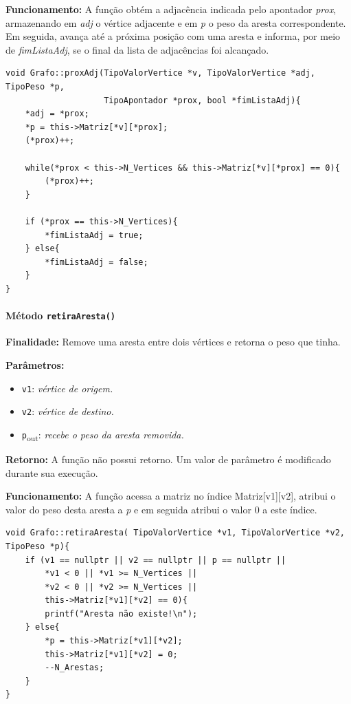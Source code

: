\documentclass{article}
\begin{document}
    \textbf{Funcionamento:} A função obtém a adjacência indicada pelo apontador \textit{prox}, armazenando em \textit{adj} o vértice adjacente e em \textit{p} o peso da aresta correspondente. Em seguida, avança até a próxima posição com uma aresta e informa, por meio de \textit{fimListaAdj}, se o final da lista de adjacências foi alcançado.

\begin{verbatim}
void Grafo::proxAdj(TipoValorVertice *v, TipoValorVertice *adj, TipoPeso *p,
                    TipoApontador *prox, bool *fimListaAdj){
    *adj = *prox;
    *p = this->Matriz[*v][*prox];
    (*prox)++;

    while(*prox < this->N_Vertices && this->Matriz[*v][*prox] == 0){
        (*prox)++;
    }

    if (*prox == this->N_Vertices){
        *fimListaAdj = true;
    } else{
        *fimListaAdj = false;
    }
}
\end{verbatim}
\paragraph{Método \texttt{retiraAresta()}}

    \mbox{}\par
    \noindent
    \textbf{Finalidade:} Remove uma aresta entre dois vértices e retorna o peso que tinha.

    \textbf{Parâmetros:}
    \begin{itemize}
       \item \texttt{v1}: \textit{vértice de origem.}
       \item \texttt{v2}: \textit{vértice de destino.}

        \item \texttt{p}\textsubscript{out}: \textit{recebe o peso da aresta removida.}
        
    \end{itemize}

    \textbf{Retorno:} A função não possui retorno. Um valor de parâmetro é modificado durante sua execução.

    \textbf{Funcionamento:} A função acessa a matriz no índice Matriz[v1][v2], atribui o valor do peso desta aresta a \textit{p} e em seguida atribui o valor 0 a este índice.

\begin{verbatim}
void Grafo::retiraAresta( TipoValorVertice *v1, TipoValorVertice *v2, TipoPeso *p){
    if (v1 == nullptr || v2 == nullptr || p == nullptr ||
        *v1 < 0 || *v1 >= N_Vertices ||
        *v2 < 0 || *v2 >= N_Vertices ||
        this->Matriz[*v1][*v2] == 0){
        printf("Aresta não existe!\n");
    } else{
        *p = this->Matriz[*v1][*v2];
        this->Matriz[*v1][*v2] = 0;
        --N_Arestas;
    }
}
\end{verbatim}
\end{document}
